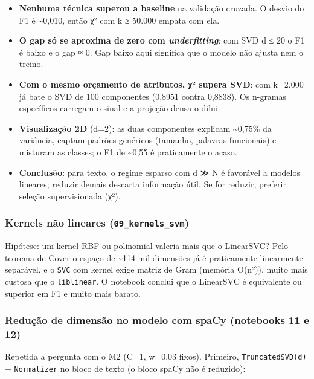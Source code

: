 \documentclass[
  brazilian,
  11pt,
]{article}
\providecommand{\tightlist}{%
  \setlength{\itemsep}{0pt}\setlength{\parskip}{0pt}}
\begin{document}
\begin{itemize}
\tightlist
\item
  \textbf{Nenhuma técnica superou a baseline} na validação cruzada. O desvio do F1 é \textasciitilde0,010, então χ² com k ≥ 50.000 empata com ela.
\item
  \textbf{O gap só se aproxima de zero com \emph{underfitting}}: com SVD d ≤ 20 o F1 é baixo e o gap ≈ 0. Gap baixo aqui significa que o modelo não ajusta nem o treino.
\item
  \textbf{Com o mesmo orçamento de atributos, χ² supera SVD}: com k=2.000 já bate o SVD de 100 componentes (0,8951 contra 0,8838). Os n-gramas específicos carregam o sinal e a projeção densa o dilui.
\item
  \textbf{Visualização 2D} (d=2): as duas componentes explicam \textasciitilde0,75\% da variância, captam padrões genéricos (tamanho, palavras funcionais) e misturam as classes; o F1 de \textasciitilde0,55 é praticamente o acaso.
\item
  \textbf{Conclusão}: para texto, o regime esparso com d ≫ N é favorável a modelos lineares; reduzir demais descarta informação útil. Se for reduzir, preferir seleção supervisionada (χ²).
\end{itemize}

\subsubsection{\texorpdfstring{Kernels não lineares (\texttt{09\_kernels\_svm})}{Kernels não lineares (09\_kernels\_svm)}}\label{kernels-nuxe3o-lineares-09_kernels_svm}

Hipótese: um kernel RBF ou polinomial valeria mais que o LinearSVC? Pelo teorema de Cover o espaço de \textasciitilde114 mil dimensões já é praticamente linearmente separável, e o \texttt{SVC} com kernel exige matriz de Gram (memória O(n²)), muito mais custosa que o \texttt{liblinear}. O notebook conclui que o LinearSVC é equivalente ou superior em F1 e muito mais barato.

\subsubsection{Redução de dimensão no modelo com spaCy (notebooks 11 e 12)}\label{reduuxe7uxe3o-de-dimensuxe3o-no-modelo-com-spacy-notebooks-11-e-12}

Repetida a pergunta com o M2 (C=1, w=0,03 fixos). Primeiro, \texttt{TruncatedSVD(d)} + \texttt{Normalizer} no bloco de texto (o bloco spaCy não é reduzido):
\end{document}
